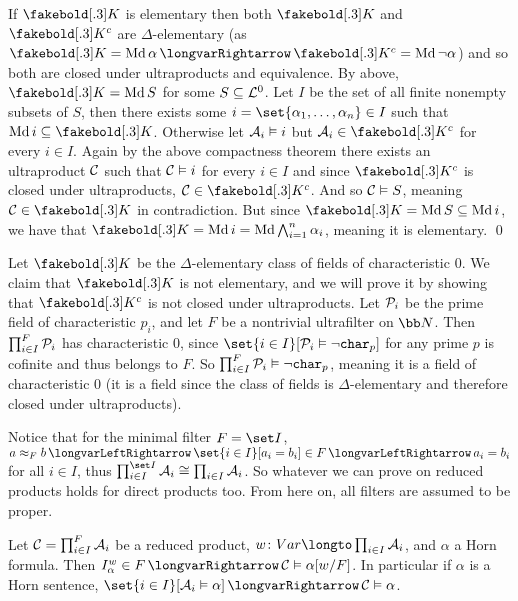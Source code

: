     \item If $\K$ is elementary then both $\K$ and $\K^c$ are $\Delta$-elementary (as $\K=\Md\alpha\implies\K^c=\Md\neg\alpha$) and so both are closed under ultraproducts and equivalence.
    By above, $\K=\Md S$ for some $S\subseteq{\cal L}^0$.
    Let $I$ be the set of all finite nonempty subsets of $S$, then there exists some $i=\set{\alpha_1,\dots,\alpha_n}\in I$ such that $\Md i\subseteq\K$.
    Otherwise let ${\cal A}_i\vDash i$ but ${\cal A}_i\in\K^c$ for every $i\in I$.
    Again by the above compactness theorem there exists an ultraproduct ${\cal C}$ such that ${\cal C}\vDash i$ for every $i\in I$ and since $\K^c$ is closed under ultraproducts, ${\cal C}\in\K^c$.
    And so ${\cal C}\vDash S$, meaning ${\cal C}\in\K$ in contradiction.
    But since $\K=\Md S\subseteq\Md i$, we have that $\K=\Md i=\Md\bigwedge_{i=1}^n\alpha_i$, meaning it is elementary.
    \qed
\eenum

\bexam

    Let $\K$ be the $\Delta$-elementary class of fields of characteristic $0$.
    We claim that $\K$ is not elementary, and we will prove it by showing that $\K^c$ is not closed under ultraproducts.
    Let ${\cal P}_i$ be the prime field of characteristic $p_i$, and let $F$ be a nontrivial ultrafilter on ${\bb N}$.
    Then $\prod_{i\in I}^F{\cal P}_i$ has characteristic $0$, since $\set{i\in I}[{\cal P}_i\vDash\neg{\tt char}_p]$ for any prime $p$ is cofinite and thus belongs to $F$.
    So $\prod_{i\in I}^F{\cal P}_i\vDash\neg{\tt char}_p$, meaning it is a field of characteristic $0$ (it is a field since the class of fields is $\Delta$-elementary and therefore closed under
    ultraproducts).

\eexam

Notice that for the minimal filter $F=\set I$, $a\approx_F b\iff\set{i\in I}[a_i=b_i]\in F\iff a_i=b_i$ for all $i\in I$, thus $\prod_{i\in I}^{\set I}{\cal A}_i\cong\prod_{i\in I}{\cal A}_i$.
So whatever we can prove on reduced products holds for direct products too.
From here on, all filters are assumed to be proper.

\bthrm

    Let ${\cal C}=\prod_{i\in I}^F{\cal A}_i$ be a reduced product, $w\colon\Var\longto\prod_{i\in I}{\cal A}_i$, and $\alpha$ a Horn formula.
    Then $I^w_\alpha\in F\implies{\cal C}\vDash\alpha[w/F]$.
    In particular if $\alpha$ is a Horn sentence, $\set{i\in I}[{\cal A}_i\vDash\alpha]\implies{\cal C}\vDash\alpha$.

\ethrm

